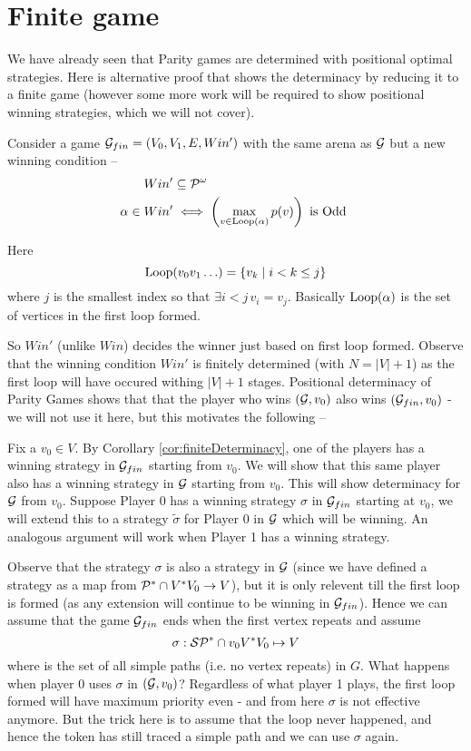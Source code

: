 \section{Finite game}
\label{sec:parityFiniteGame}
We have already seen that Parity games are determined with positional optimal strategies. Here is alternative proof that shows the determinacy by reducing it to a finite game (however some more work will be required to show positional winning strategies, which we will not cover).

Consider a game $\mathcal{G}_{fin}=(V_0,V_1,E,Win')$ with the same arena as $\mathcal{G}$ but a new winning condition -- 
\begin{align}
    Win' &\subseteq \mathcal{P}^\omega\\
    \alpha \in Win' &\iff \left(\max_{v \in \operatorname*{Loop}(\alpha)} p(v)\right) \text{ is Odd }
\end{align}

Here 
\begin{equation}
    \operatorname*{Loop}(v_0v_1\ldots) = \left\{ v_k \mid i < k \leq j \right\} \label{def:loop}
\end{equation}
where $j$ is the smallest index so that $\exists i < j \, v_i = v_j$. Basically $\operatorname*{Loop}(\alpha)$ is the set of vertices in the first loop formed.

So $Win'$ (unlike $Win$) decides the winner just based on first loop formed. Observe that the winning condition $Win'$ is finitely determined (with $N=|V|+1$) as the first loop will have occured withing $|V|+1$ stages. Positional determinacy of Parity Games shows that that the player who wins $(\mathcal{G},v_0)$ also wins $(\mathcal{G}_{fin},v_0)$ - we will not use it here, but this motivates the following --

Fix a $v_0 \in V$. By Corollary \ref{cor:finiteDeterminacy}, one of the players has a winning strategy in $\mathcal{G}_{fin}$ starting from $v_0$. We will show that this same player also has a winning strategy in $\mathcal{G}$ starting from $v_0$. This will show determinacy for $\mathcal{G}$ from $v_0$. Suppose Player 0 has a winning strategy $\sigma$ in $\mathcal{G}_{fin}$ starting at $v_0$, we will extend this to a strategy $\tilde{\sigma}$ for Player 0 in $\mathcal{G}$ which will be winning. An analogous argument will work when Player 1 has a winning strategy.

Observe that the strategy $\sigma$ is also a strategy in $\mathcal{G}$ (since we have defined a strategy as a map from $\mathcal{P}^{*} \cap V^*V_0 \to V$), but it is only relevent till the first loop is formed (as any extension will continue to be winning in $\mathcal{G}_{fin}$). Hence we can assume that the game $\mathcal{G}_{fin}$ ends when the first vertex repeats and assume
\[
    \sigma : \mathcal{SP}^* \cap v_0V^*V_0 \mapsto V
\]
where \SP is the set of all simple paths (i.e. no vertex repeats) in $G$. What happens when player 0 uses $\sigma$ in $(\mathcal{G},v_0)$? Regardless of what player 1 plays, the first loop formed will have maximum priority even - and from here $\sigma$ is not effective anymore. But the trick here is to assume that the loop never happened, and hence the token has still traced a simple path and we can use $\sigma$ again.  

